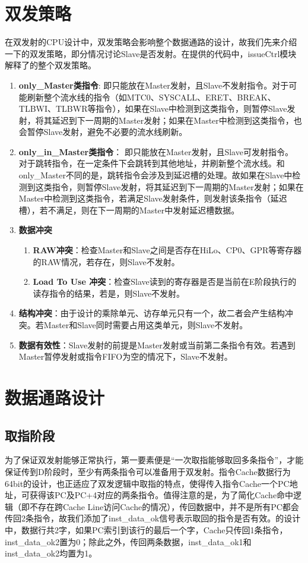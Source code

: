 \section{双发策略}
在双发射的CPU设计中，双发策略会影响整个数据通路的设计，故我们先来介绍一下\cpuname 的双发策略，即分情况讨论Slave是否发射。在提供的代码中，issueCtrl模块解释了\cpuname 的整个双发策略。

\begin{enumerate}
    \item \textbf{only\_Master类指令}: 即只能放在Master发射，且Slave不发射指令。对于可能刷新整个流水线的指令（如MTC0、SYSCALL、ERET、BREAK、TLBWI、TLBWR等指令），如果在Slave中检测到这类指令，则暂停Slave发射，将其延迟到下一周期的Master发射；如果在Master中检测到这类指令，也会暂停Slave发射，避免不必要的流水线刷新。
    \item \textbf{only\_in\_Master类指令}： 即只能放在Master发射，且Slave可发射指令。 对于跳转指令，在一定条件下会跳转到其他地址，并刷新整个流水线。和only\_Master不同的是，跳转指令会涉及到延迟槽的处理。故如果在Slave中检测到这类指令，则暂停Slave发射，将其延迟到下一周期的Master发射；如果在Master中检测到这类指令，若满足Slave发射条件，则发射该条指令（延迟槽），若不满足，则在下一周期的Master中发射延迟槽数据。
    \item \textbf{数据冲突}
    \begin{enumerate}
        \item \textbf{RAW冲突}：检查Master和Slave之间是否存在HiLo、CP0、GPR等寄存器的RAW情况，若存在，则Slave不发射。
        \item \textbf{Load To Use 冲突}：检查Slave读到的寄存器是否是当前在E阶段执行的读存指令的结果，若是，则Slave不发射。
    \end{enumerate}
    \item \textbf{结构冲突}：由于设计的乘除单元、访存单元只有一个，故二者会产生结构冲突。若Master和Slave同时需要占用这类单元，则Slave不发射。
    \item \textbf{数据有效性}：Slave发射的前提是Master发射或当前第二条指令有效。若遇到Master暂停发射或指令FIFO为空的情况下，Slave不发射。
\end{enumerate}


\section{数据通路设计}
\subsection{取指阶段}
为了保证双发射能够正常执行，第一要素便是“一次取指能够取回多条指令”，才能保证传到D阶段时，至少有两条指令可以准备用于双发射。指令Cache数据行为64bit的设计，也正适应了双发逻辑中取指的特点，使得\cpuname 传入指令Cache一个PC地址，可获得该PC及PC+4对应的两条指令。值得注意的是，为了简化Cache命中逻辑（即不存在跨Cache Line访问Cache的情况），传回数据中，并不是所有PC都会传回2条指令，故我们添加了inst\_data\_ok信号表示取回的指令是否有效。\cpuname 的设计中，数据行共2字，如果PC索引到该行的最后一个字，Cache只传回1条指令，inst\_data\_ok2置为0；除此之外，传回两条数据，inst\_data\_ok1和inst\_data\_ok2均置为1。

